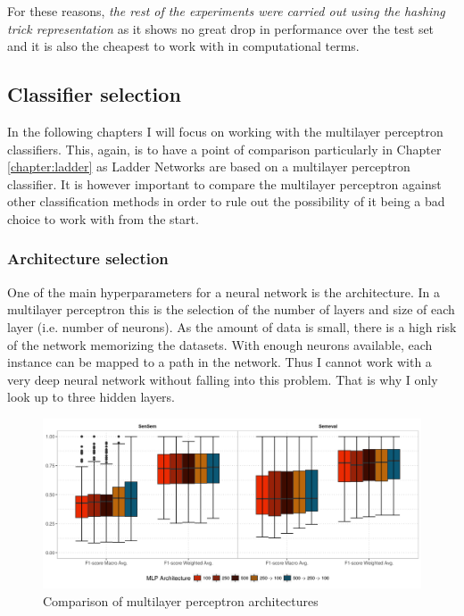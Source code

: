 For these reasons, {\em the rest of the experiments were carried out using the
hashing trick representation} as it shows no great drop in performance over the
test set and it is also the cheapest to work with in computational terms.

\subsection{Classifier selection}

In the following chapters I will focus on working with the multilayer
perceptron classifiers. This, again, is to have a point of comparison
particularly in Chapter \ref{chapter:ladder} as Ladder Networks are based on a
multilayer perceptron classifier. It is however important to compare the
multilayer perceptron against other classification methods in order to rule out
the possibility of it being a bad choice to work with from the start.

\subsubsection{Architecture selection}\label{sec:supervised:architecture:selection}

One of the main hyperparameters for a neural network is the architecture.  In a
multilayer perceptron this is the selection of the number of layers and size of
each layer (i.e. number of neurons). As the amount of data is small, there is a
high risk of the network memorizing the datasets. With enough neurons
available, each instance can be mapped to a path in the network.  Thus I cannot
work with a very deep neural network without falling into this problem. That is
why I only look up to three hidden layers.

\begin{figure}[ht]
	\includegraphics[width=\textwidth]{plots/supervised/mlp_comparison}
  \caption{Comparison of multilayer perceptron architectures}
  \label{fig:supervised:mlp}
\end{figure}

